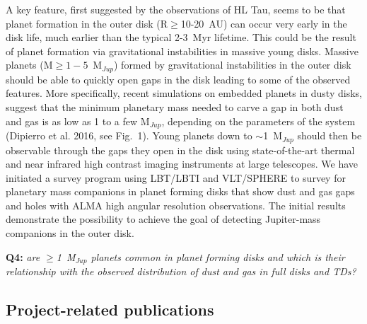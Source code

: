 \documentclass[10pt,fleqn,twoside]{article}
\begin{document}
A key feature, first suggested by the observations of HL Tau, seems to be that planet formation in the outer disk (R$\ge$10-20~AU) can occur very early in the disk life, much earlier than the typical 2-3~Myr lifetime. This could be the result of planet formation via gravitational instabilities in massive young disks. Massive planets (M$\ge 1-5$~M$_{Jup}$) formed by gravitational instabilities in the outer disk should be able to quickly open gaps in the disk leading to some of the observed features. More specifically, recent simulations on embedded planets in dusty disks, suggest that the minimum planetary mass needed to carve a gap in both dust and gas is as low as 1 to a few M$_{Jup}$, depending on the parameters of the system (Dipierro et al. 2016, see Fig.~1). Young planets down to $\sim$1~M$_{Jup}$ should then be observable through the gaps they open in the disk using state-of-the-art thermal and near infrared high contrast imaging instruments at large telescopes. We have initiated a survey program using LBT/LBTI and VLT/SPHERE to survey for planetary mass companions in planet forming disks that show dust and gas gaps and holes with ALMA high angular resolution observations. The initial results demonstrate the possibility to achieve the goal of detecting Jupiter-mass companions in the outer disk.

\smallskip
{\bf Q4:} {\it are $\ge$1~M$_{Jup}$ planets common in planet forming disks and which is their relationship with the observed distribution of dust and gas in full disks and TDs?}

\subsection{Project-related publications}

\end{document}
